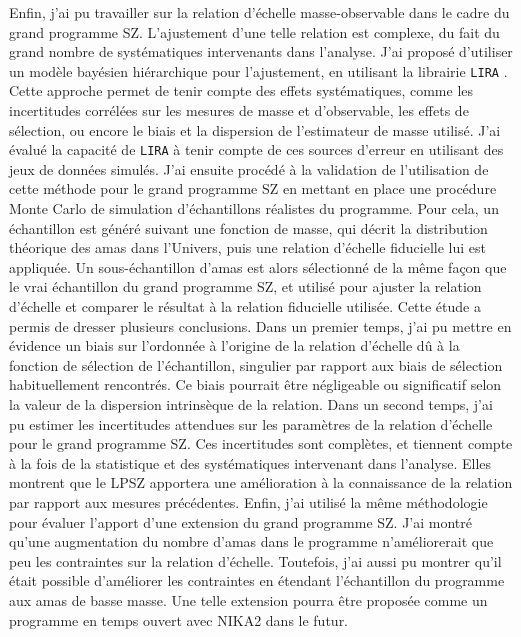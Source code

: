 Enfin, j'ai pu travailler sur la relation d'échelle masse-observable dans le cadre du grand programme SZ.
L'ajustement d'une telle relation est complexe, du fait du grand nombre de systématiques intervenants dans l'analyse.
J'ai proposé d'utiliser un modèle bayésien hiérarchique pour l'ajustement, en utilisant la librairie \texttt{LIRA} \cite{sereno_bayesian_2016}.
Cette approche permet de tenir compte des effets systématiques, comme les incertitudes corrélées sur les mesures de masse et d'observable, les effets de sélection, ou encore le biais et la dispersion de l'estimateur de masse utilisé.
J'ai évalué la capacité de \texttt{LIRA} à tenir compte de ces sources d'erreur en utilisant des jeux de données simulés.
J'ai ensuite procédé à la validation de l'utilisation de cette méthode pour le grand programme SZ en mettant en place une procédure Monte Carlo de simulation d'échantillons réalistes du programme.
Pour cela, un échantillon est généré suivant une fonction de masse, qui décrit la distribution théorique des amas dans l'Univers, puis une relation d'échelle fiducielle lui est appliquée.
Un sous-échantillon d'amas est alors sélectionné de la même façon que le vrai échantillon du grand programme SZ, et utilisé pour ajuster la relation d'échelle et comparer le résultat à la relation fiducielle utilisée.
Cette étude a permis de dresser plusieurs conclusions.
Dans un premier temps, j'ai pu mettre en évidence un biais sur l'ordonnée à l'origine de la relation d'échelle dû à la fonction de sélection de l'échantillon, singulier par rapport aux biais de sélection habituellement rencontrés.
Ce biais pourrait être négligeable ou significatif selon la valeur de la dispersion intrinsèque de la relation.
Dans un second temps, j'ai pu estimer les incertitudes attendues sur les paramètres de la relation d'échelle pour le grand programme SZ.
Ces incertitudes sont complètes, et tiennent compte à la fois de la statistique et des systématiques intervenant dans l'analyse.
Elles montrent que le LPSZ apportera une amélioration à la connaissance de la relation par rapport aux mesures précédentes.
Enfin, j'ai utilisé la même méthodologie pour évaluer l'apport d'une extension du grand programme SZ.
J'ai montré qu'une augmentation du nombre d'amas dans le programme n'améliorerait que peu les contraintes sur la relation d'échelle.
Toutefois, j'ai aussi pu montrer qu'il était possible d'améliorer les contraintes en étendant l'échantillon du programme aux amas de basse masse.
Une telle extension pourra être proposée comme un programme en temps ouvert avec NIKA2 dans le futur.

